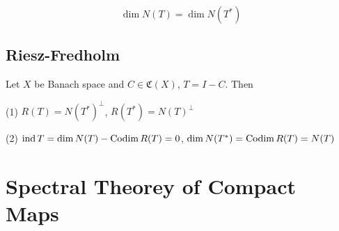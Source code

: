 \documentclass[12pt, oneside]{book}
\begin{document}
\begin{corollary}
    \begin{equation*}
        \dim N(T) =\dim N(T^*)
    \end{equation*}
\end{corollary}


\subsection{Riesz-Fredholm}
\begin{theorem}
    Let $X$ be Banach space and $C\in \mathfrak{C}(X)$, $T=I-C$. Then

    (1) $R(T) = N(T^*)^\bot$, $R(T^*) = N(T)^\bot $

    (2) $\operatorname{\operatorname{ind}} T =\dim N(T) -\operatorname{\operatorname{Codim}} R(T) = 0$, $\dim N(T^*) =\operatorname{\operatorname{Codim}} R(T)= N(T)$
\end{theorem}

























\section{Spectral Theorey of Compact Maps}
\end{document}
